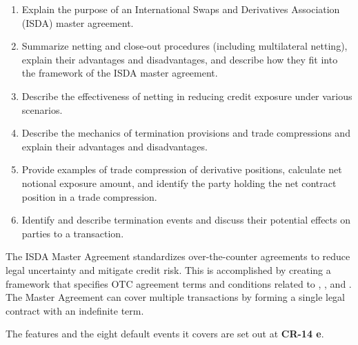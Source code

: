 
\begin{crkeybox}
\begin{enumerate}[label=\textbf{\alph*.},leftmargin=2em]
\item Explain the purpose of an International Swaps and Derivatives Association (ISDA) master agreement.
\item Summarize netting and close-out procedures (including multilateral netting), explain their advantages and disadvantages, and describe how they fit into the framework of the ISDA master agreement.
\item Describe the effectiveness of netting in reducing credit exposure under various scenarios.
\item Describe the mechanics of termination provisions and trade compressions and explain their advantages and disadvantages.
\item Provide examples of trade compression of derivative positions, calculate net notional exposure amount, and identify the party holding the net contract position in a trade compression.
\item Identify and describe termination events and discuss their potential effects on parties to a transaction.
\end{enumerate}
\end{crkeybox}


The ISDA Master Agreement standardizes over-the-counter agreements to reduce
legal uncertainty and mitigate credit risk. This is accomplished by creating a
framework that specifies OTC agreement terms and conditions related to
, , and . The Master
Agreement can cover multiple transactions by forming a single legal contract with
an indefinite term.

The features and the eight default events it covers are set out at
\textbf{CR-14 e}.


